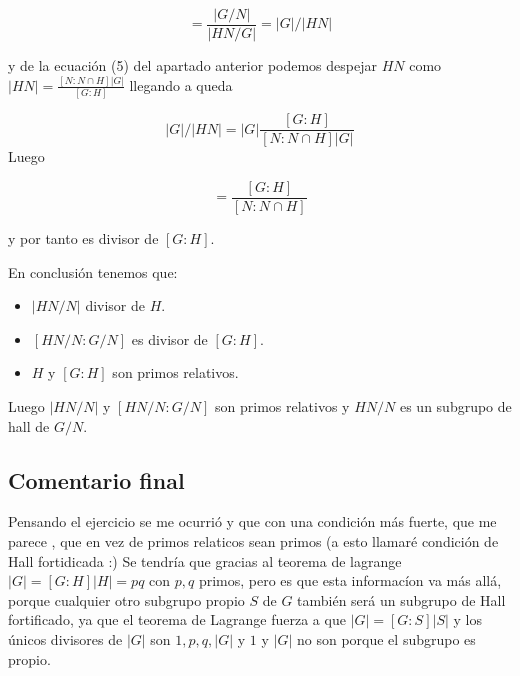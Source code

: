 \documentclass[12pt]{article}
\begin{document}
\begin{equation*}
    [HN/N : G/N] = \frac{|G/N|}{|HN/G|} = |G|/|HN|
\end{equation*}

y de la ecuación (5) del apartado anterior podemos despejar $HN$ como $|HN|= \frac{[N:N \cap H] |G|}{[G:H]}$ 
 llegando a queda

\begin{equation*}
    |G|/|HN| = |G| \frac{[G:H]}{[N:N \cap H] |G|}
\end{equation*}
Luego 

\begin{equation*}
    [HN/N : G/N] = \frac{[G:H]}{[N:N \cap H]}
\end{equation*}

y por tanto es divisor de $[G:H].$

En conclusión tenemos que: 

\begin{itemize}
    \item $|HN/N|$ divisor de $H.$
    \item $[HN/N : G/N]$ es divisor de $[G:H].$
    \item $H$ y $[G:H]$ son primos relativos. 
\end{itemize}

Luego $|HN/N|$ y $[HN/N : G/N]$ son primos relativos y 
$HN/N$ es un subgrupo de hall de $G/N.$


\subsection*{Comentario final}
Pensando el ejercicio se me ocurrió y que con una condición más fuerte, que 
me parece , que en vez de primos relaticos sean primos (a esto llamaré condición de Hall fortidicada :)  
Se tendría que gracias al teorema de lagrange  
$|G| = [G:H] |H| = pq$ con $p,q$ primos, pero es que esta informacíon va más allá,
porque cualquier otro subgrupo propio $S$ de $G$ también será un subgrupo de Hall fortificado, ya que el teorema
de Lagrange fuerza a que $|G| = [G:S] |S|$ y los únicos divisores de $|G|$ son $1,p,q,|G|$ y 
$1$ y $|G|$ no son porque el subgrupo es propio. 
\end{document}
